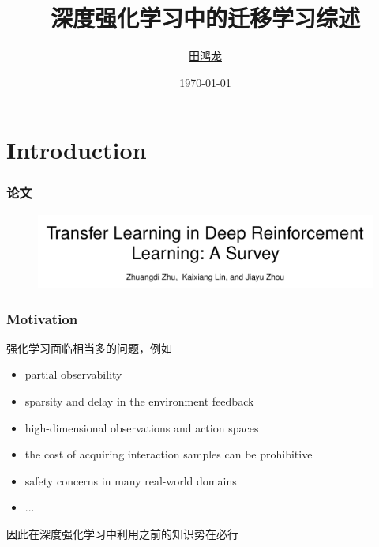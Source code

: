 \documentclass[aspectratio=169]{beamer}
\title{深度强化学习中的迁移学习综述}
\author{\href{mailto:}{田鸿龙}}
\institute{LAMDA, Nanjing University}
\date{\today}
\begin{document}
\frame{\titlepage}


\section{Introduction}

\begin{frame}
  \frametitle{论文}

  \begin{figure}
    \centering
    \includegraphics[width=1\textwidth]{imgs/paper.png}
  \end{figure}

\end{frame}

\begin{frame}
  \frametitle{Motivation}
强化学习面临相当多的问题，例如
\begin{itemize}
  \item partial observability
  \item sparsity and delay in the environment feedback
  \item high-dimensional observations and action spaces
  \item the cost of acquiring interaction samples can be prohibitive
  \item safety concerns in many real-world domains
  \item ...
\end{itemize}
因此在深度强化学习中利用之前的知识势在必行
\end{frame}
\end{document}
